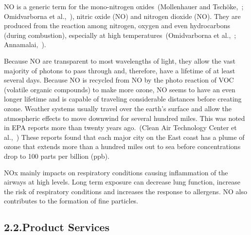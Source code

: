 \documentclass[9pt]{report}
\begin{document}
\noindent{}NO is a generic term for the mono-nitrogen oxides~(Mollenhauer and Tschöke,~; Omidvarborna et al.,~), nitric oxide (NO) and nitrogen dioxide (NO).
They are produced from the reaction among nitrogen, oxygen and even hydrocarbons (during combustion), especially at high temperatures~(Omidvarborna et al.,~; Annamalai,~).%

Because NO are transparent to most wavelengths of light, they allow the vast majority of photons to pass through and, therefore, have a lifetime of at least several days. 
Because NO is  recycled from NO by the photo reaction of VOC (volatile organic compounds) to make more ozone, NO seems to have an even longer lifetime and is capable of traveling considerable distances before creating ozone.  Weather systems usually travel over the earth’s surface and allow the atmospheric effects to move downwind for several hundred miles.
This was noted in EPA reports more than twenty years ago.~(Clean Air Technology Center et al.,~)
These reports found that each major city on the East coast has a plume of ozone that extends more than a hundred miles out to sea before concentrations drop to 100 parts per billion (ppb).%

NOx mainly impacts on respiratory conditions causing inflammation of the airways at high levels. Long term exposure can decrease lung function, increase the risk of respiratory conditions and increases the response to allergens. 
NO also contributes to the formation of fine particles.%

\subsection{2.2.\hspace*{0.5em}Product Services}\label{sec-product-services}%
\end{document}
